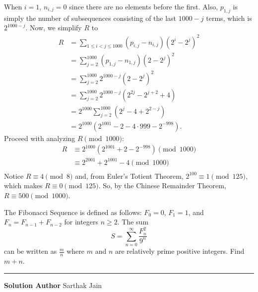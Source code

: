 \documentclass[11pt]{scrartcl}
\newcommand*{\problemfont}{\sffamily\bfseries}
\begin{document}
When $i = 1$, $n_{i,j} = 0$ since there are no elements before the first. Also, $p_{1,j}$ is simply the number of subsequences consisting of the last $1000-j$ terms, which is $2^{1000-j}$. Now, we simplify $R$ to
\begin{align*}
    R &= \sum_{1 \leq i < j \leq 1000} (p_{i,j} - n_{i,j})(2^{i} - 2^{j})^{2} \\
    &= \sum_{j = 2}^{1000} (p_{1,j} - n_{1,j})(2 - 2^{j})^{2} \\
    &= \sum_{j = 2}^{1000} 2^{1000 - j}(2 - 2^{j})^{2} \\
    &= \sum_{j = 2}^{1000} 2^{1000 - j}(2^{2j} - 2^{j + 2} + 4) \\
    &= 2^{1000}\sum_{j = 2}^{1000} (2^{j} - 4 + 2^{2 - j}) \\
    &= 2^{1000} (2^{1001} - 2 - 4 \cdot 999 - 2^{-998}).
\end{align*}
Proceed with analyzing $R \pmod{1000}$:
\begin{align*}
    R &\equiv 2^{1000} (2^{1001} + 2 - 2^{-998}) \pmod{1000} \\
    &\equiv 2^{2001} + 2^{1001} - 4 \pmod{1000} \\
\end{align*}
Notice $R \equiv 4 \pmod{8}$ and, from Euler's Totient Theorem, $2^{100} \equiv 1 \pmod{125}$, which makes $R \equiv 0 \pmod{125}$. So, by the Chinese Remainder Theorem, $R \equiv \boxed{500} \pmod{1000}$.

\pagebreak

\begin{problem}
    The Fibonacci Sequence is defined as follows: $F_{0} = 0$, $F_{1} = 1$, and $F_{n} = F_{n - 1} + F_{n - 2}$ for integers $n \geq 2$. The sum
    \[S = \sum_{n = 0}^{\infty} \frac{F_{n}^{2}}{9^{n}}\]
    can be written as $\frac{m}{n}$ where $m$ and $n$ are relatively prime positive integers. Find $m + n$.
\end{problem}

\vspace{-\baselineskip}\rule{\textwidth}{0.4pt}

{\problemfont Solution Author} Sarthak Jain
\end{document}
